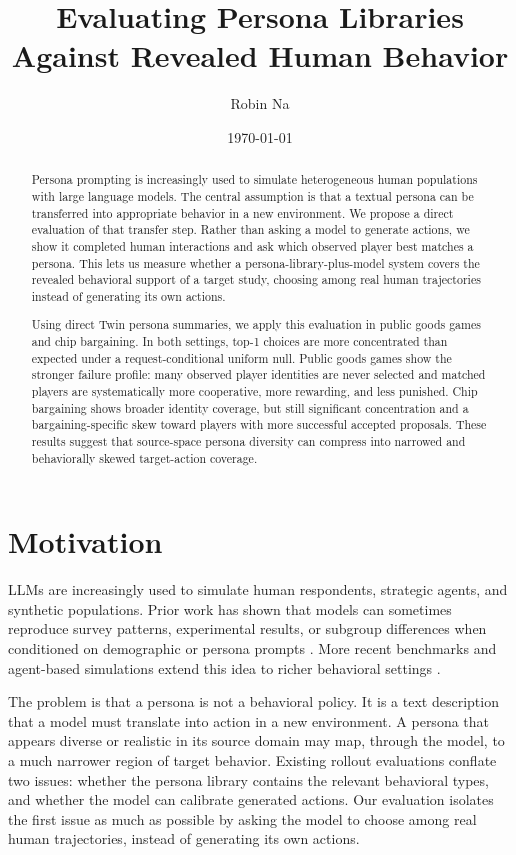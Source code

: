 \documentclass[11pt]{article}
\title{Evaluating Persona Libraries Against Revealed Human Behavior}
\author{Robin Na}
\date{\today}
\begin{document}
\maketitle

\begin{abstract}
Persona prompting is increasingly used to simulate heterogeneous human populations with large language models. The central assumption is that a textual persona can be transferred into appropriate behavior in a new environment. We propose a direct evaluation of that transfer step. Rather than asking a model to generate actions, we show it completed human interactions and ask which observed player best matches a persona. This lets us measure whether a persona-library-plus-model system covers the revealed behavioral support of a target study, choosing among real human trajectories instead of generating its own actions.

Using direct Twin persona summaries, we apply this evaluation in public goods games and chip bargaining. In both settings, top-1 choices are more concentrated than expected under a request-conditional uniform null. Public goods games show the stronger failure profile: many observed player identities are never selected and matched players are systematically more cooperative, more rewarding, and less punished. Chip bargaining shows broader identity coverage, but still significant concentration and a bargaining-specific skew toward players with more successful accepted proposals. These results suggest that source-space persona diversity can compress into narrowed and behaviorally skewed target-action coverage.
\end{abstract}

\section{Motivation}

LLMs are increasingly used to simulate human respondents, strategic agents, and synthetic populations. Prior work has shown that models can sometimes reproduce survey patterns, experimental results, or subgroup differences when conditioned on demographic or persona prompts \citep{argyle2023silicon,aher2023turing}. More recent benchmarks and agent-based simulations extend this idea to richer behavioral settings \citep{hu2025simbench,park2023generative,vezhnevets2023concordia}.

The problem is that a persona is not a behavioral policy. It is a text description that a model must translate into action in a new environment. A persona that appears diverse or realistic in its source domain may map, through the model, to a much narrower region of target behavior. Existing rollout evaluations conflate two issues: whether the persona library contains the relevant behavioral types, and whether the model can calibrate generated actions. Our evaluation isolates the first issue as much as possible by asking the model to choose among real human trajectories, instead of generating its own actions.
\end{document}
